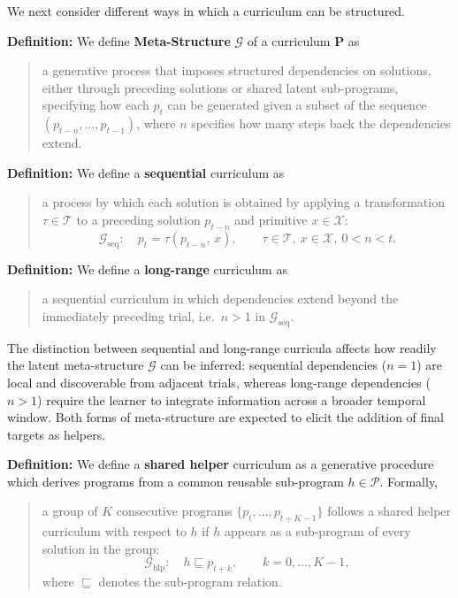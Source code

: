 \documentclass{article}
\begin{document}
We next consider different ways in which a curriculum can be structured.

\textbf{Definition:}
We define \textbf{Meta-Structure} $\mathcal{G}$ of a curriculum $\mathbf{P}$ as
\begin{quote}
a generative process that imposes structured dependencies on solutions, either through preceding solutions or shared latent sub-programs,  specifying how each $p_t$ can be generated given a subset of the sequence $(p_{t-n}, \ldots, p_{t-1})$, where $n$ specifies how many steps back the dependencies extend.
\end{quote}

\textbf{Definition:}
We define a \textbf{sequential} curriculum as
\begin{quote}
a process by which each solution is obtained by applying a transformation $\tau \in \mathcal{T}$ to a preceding solution $p_{t-n}$ and primitive $x \in \mathcal{X}$:
\begin{equation}
   \mathcal{G}_{\mathrm{seq}}: \quad p_{t} = \tau(p_{t-n},\, x),
    \qquad \tau \in \mathcal{T},\ x \in \mathcal{X},\ 0 < n < t.
\end{equation}
\end{quote}

\textbf{Definition:}
We define a \textbf{long-range} curriculum as
\begin{quote}
a sequential curriculum in which dependencies extend beyond the immediately preceding trial, i.e.\ $n > 1$ in $\mathcal{G}_{\mathrm{seq}}$.
\end{quote}

The distinction between sequential and long-range curricula affects how readily the latent meta-structure $\mathcal{G}$ can be inferred: sequential dependencies ($n = 1$) are local and discoverable from adjacent trials, whereas long-range dependencies ($n > 1$) require 
the learner to integrate information across a broader temporal window. Both forms of meta-structure are expected to elicit the addition of final targets as helpers.


\textbf{Definition:}
We define a \textbf{shared helper} curriculum as a generative procedure which derives programs from a common reusable sub-program $h \in \mathcal{P}$. Formally,
\begin{quote}
a group of $K$ consecutive programs $\{p_{t}, \ldots, p_{t+K-1}\}$ follows a shared helper curriculum with respect to $h$ if $h$ appears as a sub-program of every solution in the group:
\begin{equation}
    \mathcal{G}_{\mathrm{hlp}}: \quad h \sqsubseteq p_{t+k},
    \qquad k = 0, \ldots, K-1,
\end{equation}
where $\sqsubseteq$ denotes the sub-program relation.
\end{quote}
\end{document}
